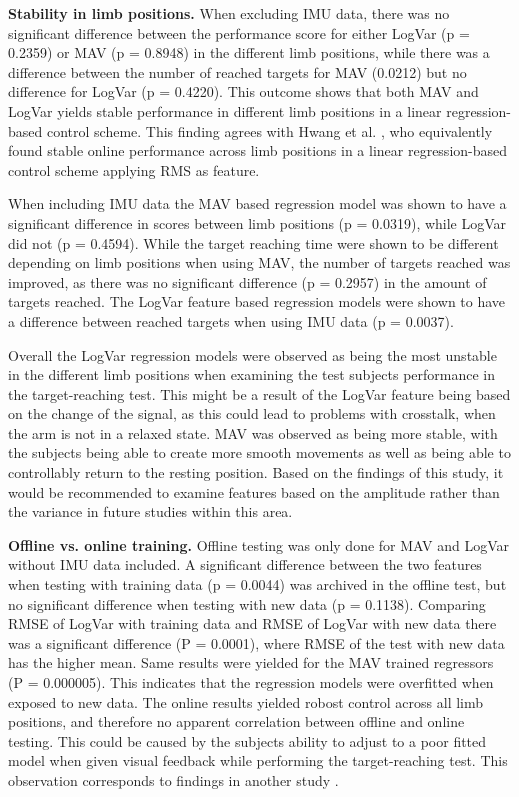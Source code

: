 \documentclass[a4paper, 10pt, conference]{ieeeconf}      %
\begin{document}
\textbf{Stability in limb positions.}
When excluding IMU data, there was no significant difference between the performance score for either LogVar (p = 0.2359) or MAV (p = 0.8948) in the different limb positions, while there was a difference between the number of reached targets for MAV (0.0212) but no difference for LogVar (p = 0.4220). This outcome shows that both MAV and LogVar yields stable performance in different limb positions in a linear regression-based control scheme. This finding agrees with Hwang et al. \cite{Hwang2017}, who equivalently found stable online performance across limb positions in a linear regression-based control scheme applying RMS as feature.

When including IMU data the MAV based regression model was shown to have a significant difference in scores between limb positions (p = 0.0319), while LogVar did not (p = 0.4594). While the target reaching time were shown to be different depending on limb positions when using MAV, the number of targets reached was improved, as there was no significant difference (p = 0.2957) in the amount of targets reached. The LogVar feature based regression models were shown to have a difference between reached targets when using IMU data (p = 0.0037).

Overall the LogVar regression models were observed as being the most unstable in the different limb positions when examining the test subjects performance in the target-reaching test. This might be a result of the LogVar feature being based on the change of the signal, as this could lead to problems with crosstalk, when the arm is not in a relaxed state. MAV was observed as being more stable, with the subjects being able to create more smooth movements as well as being able to controllably return to the resting position. Based on the findings of this study, it would be recommended to examine features based on the amplitude rather than the variance in future studies within this area.

\textbf{Offline vs. online training.}
Offline testing was only done for MAV and LogVar without IMU data included. A significant difference between the two features when testing with training data (p = 0.0044) was archived in the offline test, but no significant difference when testing with new data (p = 0.1138). Comparing RMSE of LogVar with training data and RMSE of LogVar with new data there was a significant difference (P = 0.0001), where RMSE of the test with new data has the higher mean. Same results were yielded for the MAV trained regressors (P = 0.000005). This indicates that the regression models were overfitted when exposed to new data. The online results yielded robost control across all limb positions, and therefore no apparent correlation between offline and online testing. This could be caused by the subjects ability to adjust to a poor fitted model when given visual feedback while performing the target-reaching test. This observation corresponds to findings in another study \cite{jiang2010}.
\end{document}
